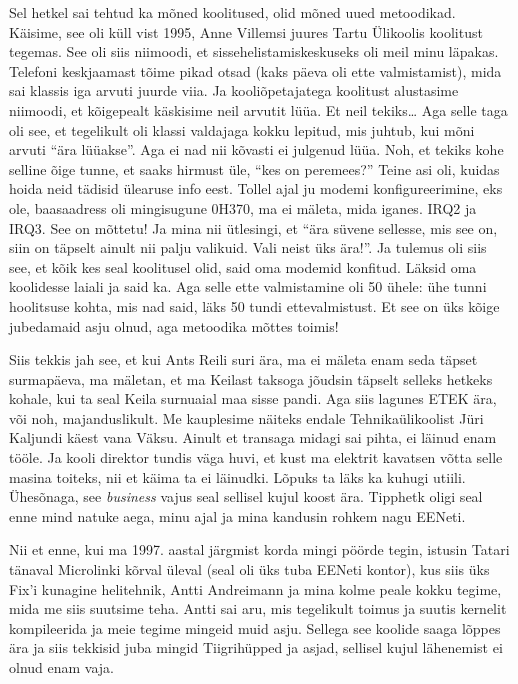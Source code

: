 Sel hetkel sai tehtud ka mõned koolitused,  olid mõned uued metoodikad. Käisime, see oli küll vist 1995, Anne Villemsi juures Tartu Ülikoolis koolitust tegemas. See oli siis niimoodi, et sissehelistamiskeskuseks oli meil minu läpakas. Telefoni keskjaamast tõime pikad otsad (kaks päeva oli ette valmistamist), mida sai klassis iga arvuti juurde viia. Ja  kooliõpetajatega koolitust alustasime niimoodi, et kõigepealt käskisime neil arvutit lüüa. Et neil tekiks\ldots {} Aga selle taga oli see, et tegelikult oli klassi valdajaga kokku lepitud, mis juhtub, kui mõni arvuti \enquote{ära lüüakse}. Aga ei nad nii kõvasti ei julgenud lüüa. Noh, et tekiks kohe selline õige tunne, et saaks hirmust üle, \enquote{kes on peremees?} Teine asi oli, kuidas hoida neid tädisid ülearuse info eest. Tollel ajal ju modemi konfigureerimine, eks ole, baasaadress oli mingisugune 0H370, ma ei mäleta, mida iganes. IRQ2 ja IRQ3. See on mõttetu! Ja mina nii ütlesingi, et \enquote{ära süvene sellesse, mis see on, siin on täpselt ainult nii palju valikuid. Vali neist üks ära!}. Ja tulemus oli siis see, et kõik kes seal koolitusel olid, said oma modemid konfitud. Läksid oma koolidesse laiali ja said ka. Aga selle ette valmistamine oli 50 ühele: ühe tunni hoolitsuse kohta, mis nad said, läks 50 tundi ettevalmistust. Et see on üks kõige jubedamaid asju olnud, aga metoodika mõttes toimis! 

Siis tekkis jah see, et kui Ants Reili suri ära, ma ei mäleta enam seda täpset surmapäeva, ma mäletan, et ma Keilast taksoga jõudsin täpselt selleks hetkeks kohale, kui ta seal Keila surnuaial maa sisse pandi. Aga siis lagunes ETEK ära, või noh, majanduslikult. Me kauplesime näiteks endale Tehnikaülikoolist Jüri Kaljundi käest vana Väksu. Ainult et transaga midagi sai pihta, ei läinud enam tööle. Ja kooli direktor tundis väga huvi, et kust ma elektrit kavatsen võtta selle masina toiteks, nii et käima ta ei läinudki. Lõpuks ta läks ka kuhugi utiili. Ühesõnaga, see \emph{business} vajus seal sellisel kujul koost ära. Tipphetk oligi seal enne mind natuke aega, minu ajal ja mina kandusin rohkem nagu EENeti. 

Nii et enne, kui ma 1997. aastal järgmist korda mingi pöörde tegin, istusin  Tatari tänaval Microlinki kõrval üleval (seal oli üks tuba EENeti kontor), kus siis üks Fix'i kunagine helitehnik, Antti Andreimann ja  mina  kolme peale kokku tegime, mida me siis suutsime teha. Antti sai aru, mis tegelikult toimus ja suutis kernelit kompileerida ja meie tegime mingeid muid asju. Sellega see koolide saaga lõppes ära ja siis tekkisid juba mingid Tiigrihüpped ja asjad, sellisel kujul lähenemist ei olnud enam vaja. 

